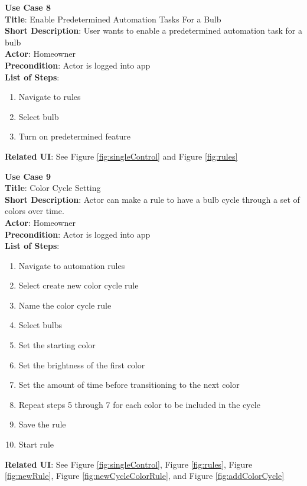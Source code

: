 \documentclass[12pt]{article}
\begin{document}
\begin{samepage}
  \begin{framed}
    \textbf{Use Case 8}\\
    \textbf{Title}: Enable Predetermined Automation Tasks For a Bulb\\
    \textbf{Short Description}: User wants to enable a predetermined automation task for a bulb\\
    \textbf{Actor}: Homeowner \\
    \textbf{Precondition}: Actor is logged into app \\
    \textbf{List of Steps}:
    \begin{enumerate}
      \item Navigate to rules
      \item Select bulb
      \item Turn on predetermined feature
    \end{enumerate}
    \textbf{Related UI}:  See Figure \ref{fig:singleControl} and Figure \ref{fig:rules} 
  \end{framed}
\end{samepage}

\begin{samepage}
  \begin{framed}
    \textbf{Use Case 9}\\
    \textbf{Title}: Color Cycle Setting\\
    \textbf{Short Description}: Actor can make a rule to have a bulb cycle through a set of colors over time. \\
    \textbf{Actor}: Homeowner \\
    \textbf{Precondition}: Actor is logged into app \\
    \textbf{List of Steps}:
    \begin{enumerate}
     \item Navigate to automation rules
     \item Select create new color cycle rule
     \item Name the color cycle rule
     \item Select bulbs
     \item Set the starting color
     \item Set the brightness of the first color
     \item Set the amount of time before transitioning to the next color
     \item Repeat steps 5 through 7 for each color to be included in the cycle
     \item Save the rule
     \item Start rule
    \end{enumerate}
    \textbf{Related UI}:  See Figure \ref{fig:singleControl}, Figure \ref{fig:rules}, Figure \ref{fig:newRule}, Figure \ref{fig:newCycleColorRule}, and Figure \ref{fig:addColorCycle}
  \end{framed}
\end{samepage}
\end{document}
